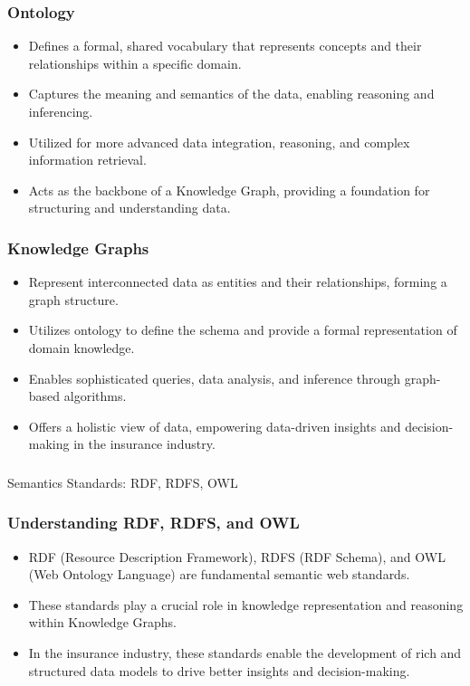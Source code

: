 \begin{frame}[fragile]
\frametitle{Ontology}
\begin{itemize}
\item Defines a formal, shared vocabulary that represents concepts and their relationships within a specific domain.
\item Captures the meaning and semantics of the data, enabling reasoning and inferencing.
\item Utilized for more advanced data integration, reasoning, and complex information retrieval.
\item Acts as the backbone of a Knowledge Graph, providing a foundation for structuring and understanding data.
\end{itemize}
\end{frame}


\begin{frame}[fragile]
\frametitle{Knowledge Graphs}
\begin{itemize}
\item Represent interconnected data as entities and their relationships, forming a graph structure.
\item Utilizes ontology to define the schema and provide a formal representation of domain knowledge.
\item Enables sophisticated queries, data analysis, and inference through graph-based algorithms.
\item Offers a holistic view of data, empowering data-driven insights and decision-making in the insurance industry.
\end{itemize}
\end{frame}

\begin{frame}[fragile]\frametitle{}
\begin{center}
{\Large Semantics Standards: RDF, RDFS, OWL }
\end{center}
\end{frame}

\begin{frame}[fragile]
\frametitle{Understanding RDF, RDFS, and OWL}
\begin{itemize}
\item RDF (Resource Description Framework), RDFS (RDF Schema), and OWL (Web Ontology Language) are fundamental semantic web standards.
\item These standards play a crucial role in knowledge representation and reasoning within Knowledge Graphs.
\item In the insurance industry, these standards enable the development of rich and structured data models to drive better insights and decision-making.
\end{itemize}
\end{frame}

